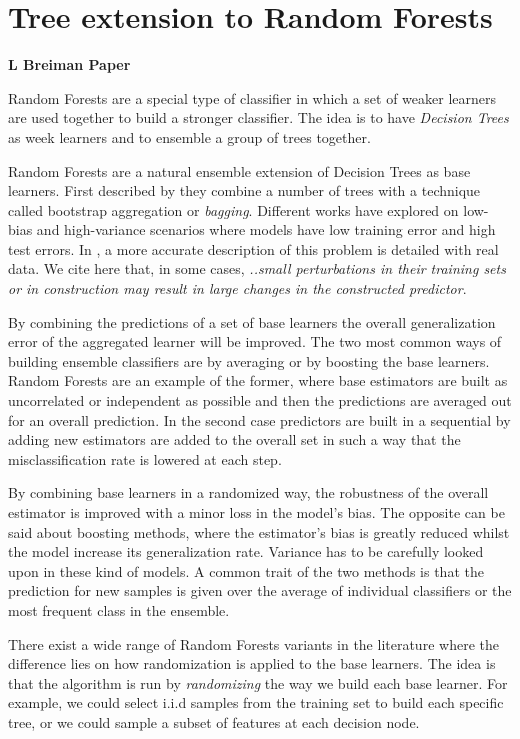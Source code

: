 \section{Tree extension to Random Forests}
\textbf{L Breiman Paper}\cite{breiman-randomforests}
    
    Random Forests are a special type of classifier in which a set of weaker learners are used together to build a stronger classifier. The idea is to have \textit{Decision Trees} as week learners and to ensemble a group of trees together.
    
    Random Forests are a natural ensemble extension of Decision Trees as base learners. First described by \cite{HoFirstRandomForest} they combine a number of trees with a technique called bootstrap aggregation or \textit{bagging}. Different works have explored on low-bias and high-variance scenarios where models have low training error and high test errors. In \cite{breiman-arcingclassifiers}, a more accurate description of this problem is detailed with  real data. We cite here that, in some cases, \textit{..small perturbations in their  training  sets  or  in  construction  may  result  in  large  changes  in  the  constructed  predictor}.
	
	By combining the predictions of a set of base learners the overall generalization error of the aggregated learner will be improved. The two most common ways of building ensemble classifiers are by averaging or by boosting the base learners. Random Forests are an example of the former, where base estimators are built as uncorrelated or independent as possible and then the predictions are averaged out for an overall prediction. In the second case predictors are built in a sequential by adding new estimators are added to the overall set in such a way that the misclassification rate is lowered at each step.
	
	By combining base learners in a randomized way, the robustness of the overall estimator is improved with a minor loss in the model's bias. The opposite can be said about boosting methods, where the estimator's bias is greatly reduced whilst the model increase its generalization rate. Variance has to be carefully looked upon in these kind of models. A common trait of the two methods is that the prediction for new samples is given over the average of individual classifiers or the most frequent class in the ensemble. 
	
	There exist a wide range of Random Forests variants in the literature \cite{breiman-randomforests} where the difference lies on how randomization is applied to the base learners. The idea is that the algorithm is run by \textit{randomizing } the way we build each base learner. For example, we could select i.i.d samples from the training set to build each specific tree, or we could sample a subset of features at each decision node.

